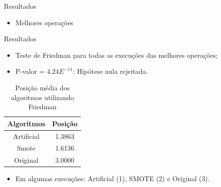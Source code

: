\documentclass{beamer}
\begin{document}
\begin{frame}{Resultados}
\setlength\leftmargini{0em}
\justifying
\begin{itemize}
\item Melhores operações %
\end{itemize}
\end{frame}
\begin{frame}{Resultados}
\setlength\leftmargini{0em}
\justifying
\begin{itemize}
\item Teste de Friedman para todas as execuções das melhores operações;
\item P-valor = $4.24E^{-11}$; Hipótese nula rejeitada.
\end{itemize}
\begin{table}[htb]
\centering
\caption{Posição média dos algoritmos utilizando Friedman}
  \begin{tabular}{c|c}
    Algoritmos  &   Posição \\ \hline
    Artificial  &   1.3863  \\
    Smote       &   1.6136  \\
    Original    &   3.0000  \\
  \end{tabular}
\end{table}
\begin{itemize}
\item Em algumas execuções: Artificial (1), SMOTE (2) e Original (3).
\end{itemize}
\end{frame}
\end{document}
